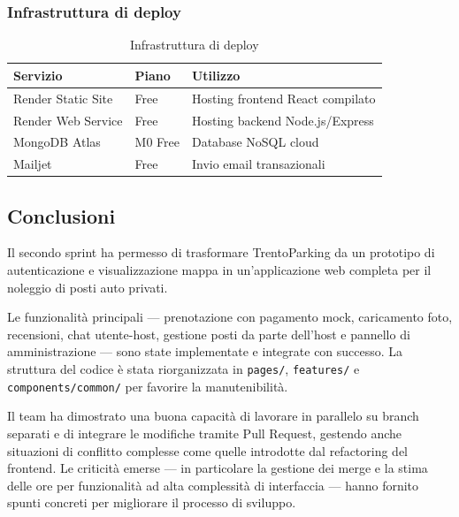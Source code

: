 \documentclass[a4paper,12pt]{article}
\begin{document}
\subsubsection*{Infrastruttura di deploy}

\begin{table}[h!]
\centering
\begin{tabular}{|l|l|l|}
\hline
\textbf{Servizio} & \textbf{Piano} & \textbf{Utilizzo} \\
\hline
Render Static Site  & Free & Hosting frontend React compilato \\
Render Web Service  & Free & Hosting backend Node.js/Express \\
MongoDB Atlas       & M0 Free & Database NoSQL cloud \\
Mailjet             & Free & Invio email transazionali \\
\hline
\end{tabular}
\caption{Infrastruttura di deploy}
\end{table}

\subsection{Conclusioni}

Il secondo sprint ha permesso di trasformare TrentoParking da un prototipo di
autenticazione e visualizzazione mappa in un'applicazione web completa per il
noleggio di posti auto privati.

Le funzionalità principali --- prenotazione con pagamento mock, caricamento foto,
recensioni, chat utente-host, gestione posti da parte dell'host e pannello di
amministrazione --- sono state implementate e integrate con successo. La struttura
del codice è stata riorganizzata in \texttt{pages/}, \texttt{features/} e
\texttt{components/common/} per favorire la manutenibilità.

Il team ha dimostrato una buona capacità di lavorare in parallelo su branch
separati e di integrare le modifiche tramite Pull Request, gestendo anche situazioni
di conflitto complesse come quelle introdotte dal refactoring del frontend. Le
criticità emerse --- in particolare la gestione dei merge e la stima delle ore per
funzionalità ad alta complessità di interfaccia --- hanno fornito spunti concreti
per migliorare il processo di sviluppo.
\end{document}
